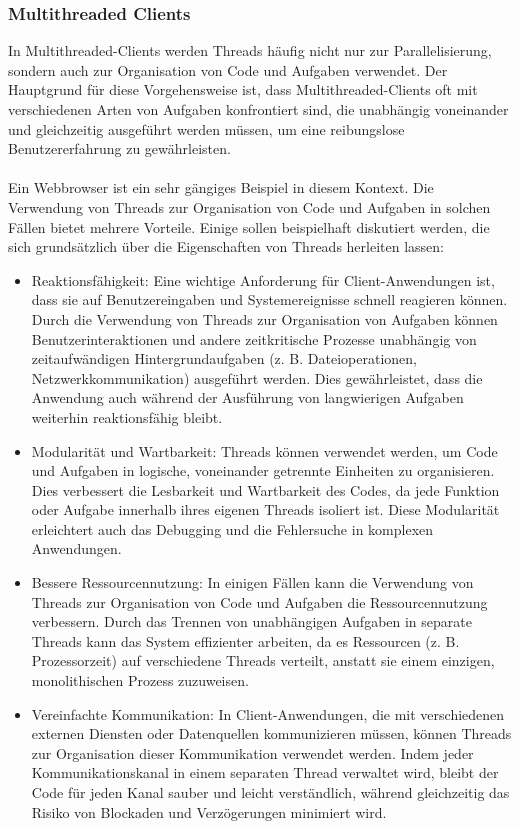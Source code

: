 \documentclass[../vs-script-first-v01.tex]{subfiles}
\begin{document}
\subsubsection{Multithreaded Clients}
In Multithreaded-Clients werden Threads häufig nicht nur zur Parallelisierung, sondern auch zur Organisation von Code und Aufgaben verwendet. Der Hauptgrund für diese Vorgehensweise ist, dass Multithreaded-Clients oft mit verschiedenen Arten von Aufgaben konfrontiert sind, die unabhängig voneinander und gleichzeitig ausgeführt werden müssen, um eine reibungslose Benutzererfahrung zu gewährleisten.
\\\\
Ein Webbrowser ist ein sehr gängiges Beispiel in diesem Kontext. Die Verwendung von Threads zur Organisation von Code und Aufgaben in solchen Fällen bietet mehrere Vorteile. Einige sollen beispielhaft diskutiert werden, die sich grundsätzlich über die Eigenschaften von Threads herleiten lassen:
\begin{itemize}
\item Reaktionsfähigkeit: Eine wichtige Anforderung für Client-Anwendungen ist, dass sie auf Benutzereingaben und Systemereignisse schnell reagieren können. Durch die Verwendung von Threads zur Organisation von Aufgaben können Benutzerinteraktionen und andere zeitkritische Prozesse unabhängig von zeitaufwändigen Hintergrundaufgaben (z. B. Dateioperationen, Netzwerkkommunikation) ausgeführt werden. Dies gewährleistet, dass die Anwendung auch während der Ausführung von langwierigen Aufgaben weiterhin reaktionsfähig bleibt.
\item Modularität und Wartbarkeit: Threads können verwendet werden, um Code und Aufgaben in logische, voneinander getrennte Einheiten zu organisieren. Dies verbessert die Lesbarkeit und Wartbarkeit des Codes, da jede Funktion oder Aufgabe innerhalb ihres eigenen Threads isoliert ist. Diese Modularität erleichtert auch das Debugging und die Fehlersuche in komplexen Anwendungen.
\item Bessere Ressourcennutzung: In einigen Fällen kann die Verwendung von Threads zur Organisation von Code und Aufgaben die Ressourcennutzung verbessern. Durch das Trennen von unabhängigen Aufgaben in separate Threads kann das System effizienter arbeiten, da es Ressourcen (z. B. Prozessorzeit) auf verschiedene Threads verteilt, anstatt sie einem einzigen, monolithischen Prozess zuzuweisen.
\item Vereinfachte Kommunikation: In Client-Anwendungen, die mit verschiedenen externen Diensten oder Datenquellen kommunizieren müssen, können Threads zur Organisation dieser Kommunikation verwendet werden. Indem jeder Kommunikationskanal in einem separaten Thread verwaltet wird, bleibt der Code für jeden Kanal sauber und leicht verständlich, während gleichzeitig das Risiko von Blockaden und Verzögerungen minimiert wird.
\end{itemize}
\end{document}
